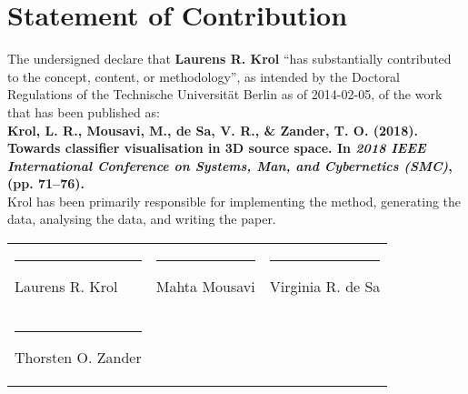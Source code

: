 \documentclass[a4paper,12pt]{article}
\title{}
\author{}
\date{}
\begin{document}
\thispagestyle{empty}

\section*{Statement of Contribution}

The undersigned declare that \textbf{Laurens R. Krol} ``has substantially contributed to the concept, content, or methodology'', as intended by the Doctoral Regulations of the Technische Universität Berlin as of 2014-02-05, of the work that has been published as: \\

\textbf{Krol, L. R., Mousavi, M., de Sa, V. R., \& Zander, T. O. (2018). Towards classifier visualisation in 3D source space. In \emph{2018 IEEE International Conference on Systems, Man, and Cybernetics (SMC)}, (pp. 71–76).} \\

Krol has been primarily responsible for implementing the method, generating the data, analysing the data, and writing the paper. \\

\begin{tabularx}{\textwidth}{XXX}
\vspace{2cm} \hrule Laurens R. Krol & \vspace{2cm} \hrule Mahta Mousavi & \vspace{2cm} \hrule Virginia R. de Sa \\
\vspace{2cm} \hrule Thorsten O. Zander &  & 
\end{tabularx}
\end{document}

